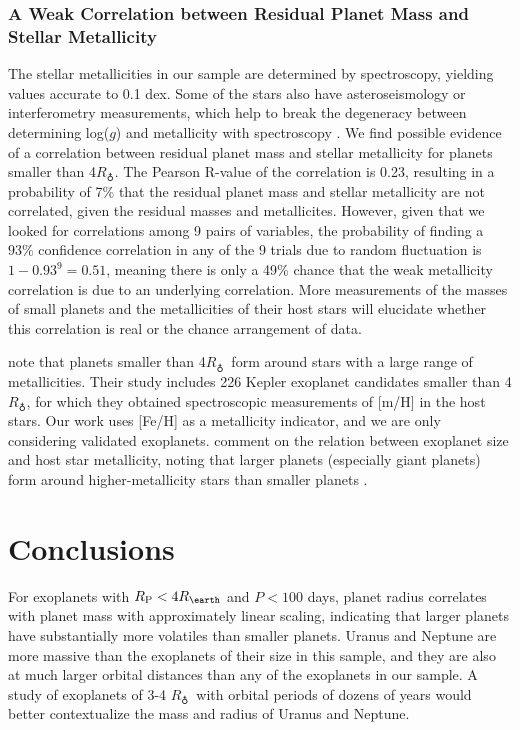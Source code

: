 \documentclass[iop]{emulateapj}
\newcommand{\rpl}{\ensuremath{R_{\rm P}}}
\newcommand{\rearth}{\ensuremath{R_\earth}}
\newcommand{\rspecial}{4 \rearth}
\begin{document}
\subsubsection{A Weak Correlation between Residual Planet Mass and Stellar Metallicity}
The stellar metallicities in our sample are determined by spectroscopy, yielding values accurate to 0.1 dex.  Some of the stars also have asteroseismology or interferometry measurements, which help to break the degeneracy between determining log($g$) and metallicity with spectroscopy \citep{Torres2012}.  We find possible evidence of a correlation between residual planet mass and stellar metallicity for planets smaller than 4\rearth.  The Pearson R-value of the correlation is 0.23, resulting in a probability of 7\% that the residual planet mass and stellar metallicity are not correlated, given the residual masses and metallicites.  However, given that we looked for correlations among 9 pairs of variables, the probability of finding a $93\%$ confidence correlation in any of the 9 trials due to random fluctuation is $1 - 0.93^9 = 0.51$, meaning there is only a 49\% chance that the weak metallicity correlation is due to an underlying correlation.  More measurements of the masses of small planets and the metallicities of their host stars will elucidate whether this correlation is real or the chance arrangement of data.

\citet{Buchhave2012} note that planets smaller than 4\rearth\ form around stars with a large range of metallicities.  Their study includes 226 Kepler exoplanet candidates smaller than 4\rearth, for which they obtained spectroscopic measurements of [m/H] in the host stars.  Our work uses [Fe/H] as a metallicity indicator, and we are only considering validated exoplanets.   \citet{Buchhave2012} comment on the relation between exoplanet size and host star metallicity, noting that larger planets (especially giant planets) form around higher-metallicity stars than smaller planets \citep[see Figure 1 of][]{Buchhave2012}.


\section{Conclusions}
For exoplanets with $\rpl < \rspecial$ and $P < 100$ days, planet radius correlates with planet mass with approximately linear scaling, indicating that larger planets have substantially more volatiles than smaller planets.  Uranus and Neptune are more massive than the exoplanets of their size in this sample, and they are also at much larger orbital distances than any of the exoplanets in our sample.  A study of exoplanets of 3-4 \rearth\ with orbital periods of dozens of years would better contextualize the mass and radius of Uranus and Neptune.
\end{document}
